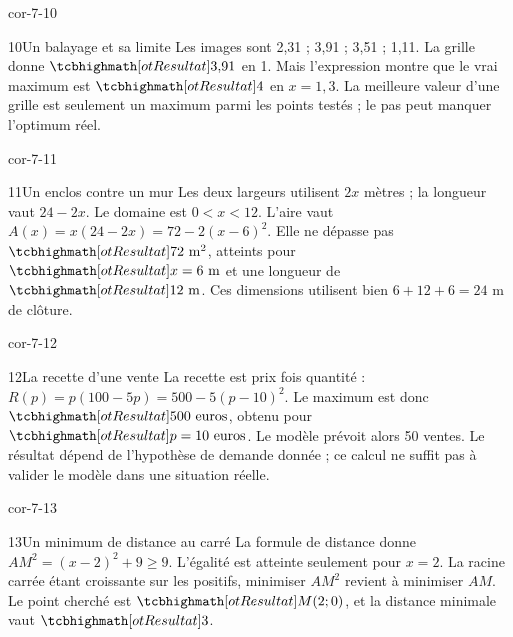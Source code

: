 \begin{blocLivre}{cor-7-10}
\begin{corrige}{10}{Un balayage et sa limite}
Les images sont 2,31 ; 3,91 ; 3,51 ; 1,11. La grille donne $\res{3{,}91}$ en 1. Mais l’expression montre que le vrai maximum est $\res4$ en $x=1{,}3$. La meilleure valeur d’une grille est seulement un maximum parmi les points testés ; le pas peut manquer l’optimum réel.
\end{corrige}
\end{blocLivre}
\begin{blocLivre}{cor-7-11}
\begin{corrige}{11}{Un enclos contre un mur}
Les deux largeurs utilisent $2x$ mètres ; la longueur vaut $24-2x$. Le domaine est $0<x<12$. L’aire vaut $A(x)=x(24-2x)=72-2(x-6)^2$. Elle ne dépasse pas $\res{72\text{ m}^2}$, atteints pour $\res{x=6\text{ m}}$ et une longueur de $\res{12\text{ m}}$. Ces dimensions utilisent bien $6+12+6=24$ m de clôture.
\label{fig-cor-7-11}
\end{corrige}
\end{blocLivre}
\begin{blocLivre}{cor-7-12}
\begin{corrige}{12}{La recette d’une vente}
La recette est prix fois quantité : $R(p)=p(100-5p)=500-5(p-10)^2$. Le maximum est donc $\res{500\text{ euros}}$, obtenu pour $\res{p=10\text{ euros}}$. Le modèle prévoit alors 50 ventes. Le résultat dépend de l’hypothèse de demande donnée ; ce calcul ne suffit pas à valider le modèle dans une situation réelle.
\end{corrige}
\end{blocLivre}
\begin{blocLivre}{cor-7-13}
\begin{corrige}{13}{Un minimum de distance au carré}
La formule de distance donne $AM^2=(x-2)^2+9\ge9$. L’égalité est atteinte seulement pour $x=2$. La racine carrée étant croissante sur les positifs, minimiser $AM^2$ revient à minimiser $AM$. Le point cherché est $\res{M(2;0)}$, et la distance minimale vaut $\res3$.
\label{fig-cor-7-13}
\end{corrige}
\end{blocLivre}
